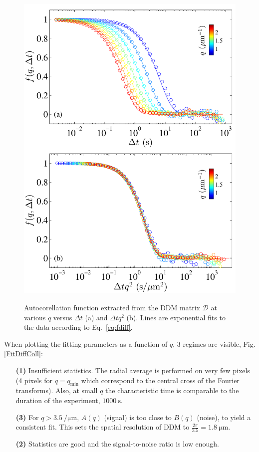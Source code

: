 \documentclass[%
 aip,
 jmp,%
 amsmath,amssymb,
reprint,%
]{revtex4-1}
\newcommand{\tg}[1]{{\color{magenta}#1}} %
\begin{document}
\begin{figure}
	\includegraphics[width=\linewidth]{ISFColloides.pdf}\\
	\caption{\tg{Autocorellation function extracted from the DDM matrix $\mathcal{D}$} at various $q$ versus $\Delta t$ (a) and $\Delta tq^2$ (b). Lines are exponential fits to the data according to Eq.~\ref{eq:fdiff}.}
	\label{ISF}
\end{figure}

When plotting the fitting parameters as a function of $q$, 3 regimes are visible,  Fig.\ref{FitDiffColl}:
\begin{itemize}
\item[\textbf{(1)}] Insufficient statistics. The radial average is performed on very few pixels (4 pixels for $q = q_\text{min}$ which correspond to the central cross of the Fourier transforms).  Also, at small $q$ the characteristic time is comparable to the duration of the experiment, $\SI{1000}{\second}$.
\item[\textbf{(3)}] For  $q>\SI{3.5}{\per\micro\meter}$, $A(q)$ (signal) is too close to $B(q)$ (noise), to yield a consistent fit. This sets the spatial resolution of DDM to  $\frac{2\pi}{3.5} = \SI{1.8}{\micro\meter}$.
\item[\textbf{(2)}] Statistics are good and the signal-to-noise ratio is low enough.
\end{itemize}
\end{document}
